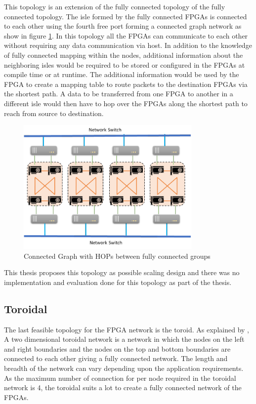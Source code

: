 This topology is an extension of the fully connected topology of the fully
connected topology. The isle formed by the fully connected FPGAs is connected
to each other using the fourth free port forming a connected graph network
as show in figure \ref{fig:connected_graph}.
In this topology all the FPGAs can communicate to each other without requiring
any data communication via host. In addition to the knowledge of fully
connected mapping within the nodes, additional information about the neighboring
isles would be required to be stored or configured in the FPGAs at compile time
or at runtime. The additional information would be used by the FPGA to create
a mapping table to route packets to the destination FPGAs via the shortest path.
A data to be transferred from one FPGA to another in a different isle would
then have to hop over the FPGAs along the shortest path to reach
from source to destination.

\begin{figure}[h]%
    \centering
    \includegraphics[width=0.8\textwidth]{images/full_connect}
    \caption{Connected Graph with HOPs between fully connected groups}
    \label{fig:connected_graph}
\end{figure}

This thesis proposes this topology as possible scaling design and there was no
implementation and evaluation done for this topology as part of the thesis.

\subsection{Toroidal}
\label{sec:toroidal}

The last feasible topology for the FPGA network is the toroid. As explained by
\textcite{robertazzi_toroidal_1988}, A two dimensional toroidal network is
a network in which the nodes on the left and right boundaries and the
nodes on the top and bottom boundaries are connected to each other giving
a fully connected network. The length and breadth of the network can vary
depending upon the application requirements. As the maximum number of
connection for per node required in the toroidal network is 4, the toroidal
suits a lot to create a fully connected network of the FPGAs.


